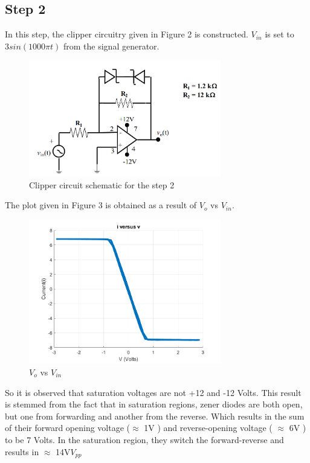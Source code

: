\documentclass[letterpaper,12pt]{article}
\begin{document}
\subsection{Step 2}
In this step, the clipper circuitry given in Figure 2 is constructed. \(V_{in}\) is set to \(3 sin (1000\pi t)\) from the signal generator.
\begin{figure}[H]
    \centering
    \includegraphics[width = 0.75\textwidth]{2SCH.png}
    \caption{Clipper circuit schematic for the step 2}
\end{figure} 
The plot given in Figure 3 is obtained as a result of \(V_o\) vs \(V_{in}\).
\begin{figure}[H]
    \centering
    \includegraphics[width = 0.75\textwidth]{2.png}
    \caption{\(V_o\) vs \(V_{in}\)}
\end{figure} 
So it is observed that saturation voltages are not +12 and -12 Volts. This result is stemmed from the fact that in saturation regions, zener diodes are both open, but one from forwarding and another from the reverse. Which results in the sum of their forward opening voltage (\(\approx\)  1V ) and reverse-opening voltage ( \( \approx \) 6V ) to be 7 Volts. In the saturation region, they switch the forward-reverse and results in \( \approx\) 14V\(V_{pp}\)
\end{document}
